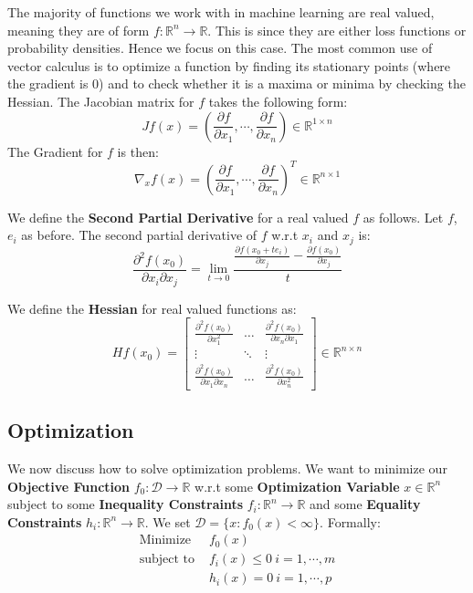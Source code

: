 \documentclass[]{article}
\theoremstyle{mattstyle}
\theoremstyle{definition}
\begin{document}
The majority of functions we work with in machine learning are real valued, meaning they are of form $f: \mathbb{R}^n \rightarrow \mathbb{R}$. This is since they are either loss functions or probability densities. Hence we focus on this case. The most common use of vector calculus is to optimize a function by finding its stationary points (where the gradient is 0) and to check whether it is a maxima or minima by checking the Hessian. The Jacobian matrix for $f$ takes the following form: 
$$J f(x) = \left(\frac{\partial f}{\partial x_1}, \cdots, \frac{\partial f}{\partial x_n}\right) \in \mathbb{R}^{1 \times n}$$
The Gradient for $f$ is then: 
$$\nabla_{x} f(x) = \left(\frac{\partial f}{\partial x_1}, \cdots, \frac{\partial f}{\partial x_n}\right)^T \in \mathbb{R}^{n \times 1}$$

We define the \textbf{Second Partial Derivative} for a real valued $f$ as follows. Let $f$, $e_i$ as before. The second partial derivative of $f$ w.r.t $x_i$ and $x_j$ is:
$$
\frac{\partial^2 f(x_0)}{\partial x_i \partial x_j} = 
\lim\limits_{t \rightarrow 0} \frac{ \frac{\partial f(x_0+te_i)}{\partial x_j} - \frac{\partial f(x_0)}{\partial x_j} }{t}
$$

We define the \textbf{Hessian} for real valued functions as: 
$$H f(x_0) = \begin{bmatrix}
\frac{\partial^2 f(x_0)}{\partial x_1^2} & \dots  & \frac{\partial^2 f(x_0)}{\partial x_n \partial x_1} \\
\vdots & \ddots & \vdots \\
\frac{\partial^2 f(x_0)}{\partial x_1 \partial x_n} & \dots  & \frac{\partial^2 f(x_0)}{\partial x_n^2}
\end{bmatrix}\in \mathbb{R}^{n \times n}$$

\newpage

\subsection{Optimization}\label{sec:optim}

We now discuss how to solve optimization problems. We want to minimize our \textbf{Objective Function} $f_0 : \mathcal{D} \rightarrow \mathbb{R}$ w.r.t some  \textbf{Optimization Variable} $x \in \mathbb{R}^n$ subject to some \textbf{Inequality Constraints} $f_i: \mathbb{R}^n \rightarrow \mathbb{R}$ and some \textbf{Equality Constraints} $h_i: \mathbb{R}^n \rightarrow \mathbb{R}$.
We set $\mathcal{D} = \{x : f_0(x) < \infty\}$.
Formally:
\begin{align*}
\text{Minimize } & f_0(x) \\
\text{subject to } & f_i(x) \le 0 \ i = 1, \cdots, m\\
& h_i(x) = 0 \ i = 1, \cdots, p
\end{align*}
\end{document}

